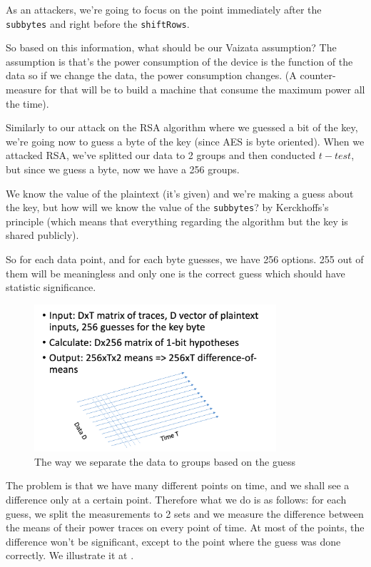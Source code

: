 As an attackers, we're going to focus on the point immediately after the
\texttt{subbytes} and right before the \texttt{shiftRows}. 

So based on this information, what should be our Vaizata assumption? The
assumption is that's the power consumption of the device is the function of the
data so if we change the data, the power consumption changes. (A counter-measure
for that will be to build a machine that consume the maximum power all the
time).

Similarly to our attack on the RSA algorithm where we guessed a bit of the key,
we're going now to guess a byte of the key (since AES is byte oriented). When we
attacked RSA, we've splitted our data to 2 groups and then conducted $t-test$,
but since we guess a byte, now we have a 256 groups. 

We know the value of the plaintext (it's given) and we're making a guess about
the key, but how will we know the value of the \texttt{subbytes}? by
Kerckhoffs's principle (which means that everything regarding the algorithm but
the key is shared publicly).

So for each data point, and for each byte guesses, we have 256 options. 255 out
of them will be meaningless and only one is the correct guess which should have
statistic significance.

\begin{figure}[!ht]
    \centering
    \includegraphics[width=0.8\textwidth]{images/Lecture6/dpa-separation-figure.png}
    \caption{The way we separate the data to groups based on the guess} \label{fig:dpa-separation-figure}
\end{figure}

The problem is that we have many different points on time, and we shall see a
difference only at a certain point. Therefore what we do is as follows: for each
guess, we split the measurements to 2 sets and we measure the difference between
the means of their power traces on every point of time. At most of the points,
the difference won't be significant, except to the point where the guess was
done correctly. We illustrate it at .


